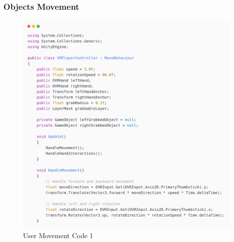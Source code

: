 \subsubsection{Objects Movement}
\begin{figure}[h]
	\centering
	\includegraphics[width=1\textwidth, height=0.7\textheight]{Images/playerp1.png}
	\caption{User Movement Code 1}
	\label{User Movement Code 1}
\end{figure}
\newpage

